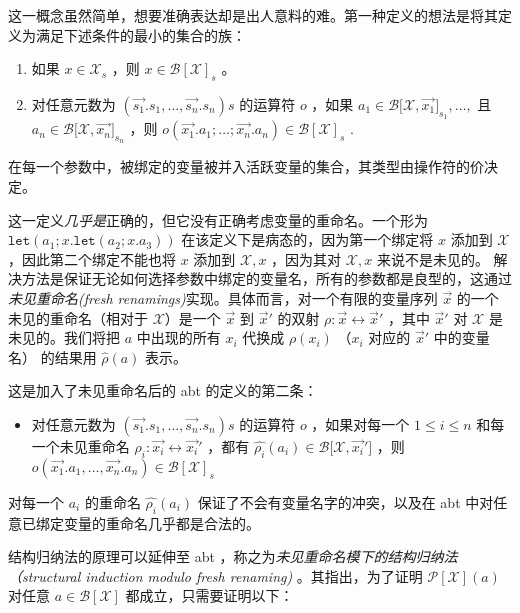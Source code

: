 这一概念虽然简单，想要准确表达却是出人意料的难。第一种定义的想法是将其定义为满足下述条件的最小的集合的族：

\begin{enumerate}
\def\labelenumi{\arabic{enumi}.}
\item
  如果 \(x\in \mathcal{X}_s\) ，则 \(x \in \mathcal{B[X]}_s\) 。
\item
  对任意元数为 \((\vec{s_1}.s_1,\dots,\vec{s_n}.s_n)s\) 的运算符 \(o\)
  ，如果 \(a_1\in \mathcal{B[X},\vec{x_1}]_{s_1},\dots,\) 且
  \(a_n\in \mathcal{B[X},\vec{x_n}]_{s_n}\) ，则
  \(o(\vec{x_1}.a_1;\dots;\vec{x_n}.a_n)\in \mathcal{B[X]}_s\) .
\end{enumerate}

在每一个参数中，被绑定的变量被并入活跃变量的集合，其类型由操作符的价决定。

这一定义\emph{几乎是}正确的，但它没有正确考虑变量的重命名。一个形为
\(\texttt{let}(a_1;x.\texttt{let}(a_2;x.a_3))\)
在该定义下是病态的，因为第一个绑定将 \(x\) 添加到 \(\mathcal{X}\)
，因此第二个绑定不能也将 \(x\) 添加到 \(\mathcal{X},x\) ，因为其对
\(\mathcal{X},x\) 来说不是未见的。
解决方法是保证无论如何选择参数中绑定的变量名，所有的参数都是良型的，这通过\emph{未见重命名(fresh
renamings)}实现。具体而言，对一个有限的变量序列 \(\vec{x}\)
的一个未见的重命名（相对于 \(\mathcal{X}\)）是一个 \(\vec{x}\) 到
\(\vec{x}'\) 的双射 \(\rho : \vec{x} \leftrightarrow \vec{x}'\) ，其中
\(\vec{x}'\) 对 \(\mathcal{X}\) 是未见的。我们将把 \(a\) 中出现的所有
\(x_i\) 代换成 \(\rho(x_i)\) （\(x_i\) 对应的 \(\vec{x}'\) 中的变量名）
的结果用 \(\hat{\rho}(a)\) 表示。

这是加入了未见重命名后的 abt 的定义的第二条：

\begin{itemize}
\item
  对任意元数为 \((\vec{s_1}.s_1,\dots,\vec{s_n}.s_n)s\) 的运算符 \(o\)
  ，如果对每一个 \(1 \leq i \leq n\) 和每一个未见重命名
  \(\rho_i:\vec{x_i}\leftrightarrow \vec{x_i}'\) ，都有
  \(\hat{\rho_i}(a_i)\in \mathcal{B[X},\vec{x_i}']\) ，则
  \(o(\vec{x_1}.a_1,\dots,\vec{x_n}.a_n)\in \mathcal{B[X]}_s\)
\end{itemize}

对每一个 \(a_i\) 的重命名 \(\hat{\rho_i}(a_i)\)
保证了不会有变量名字的冲突，以及在 abt
中对任意已绑定变量的重命名几乎都是合法的。

结构归纳法的原理可以延伸至 abt
，称之为\emph{未见重命名模下的结构归纳法（structural induction modulo
fresh renaming)} 。其指出，为了证明 \(\mathcal{P[X]}(a)\) 对任意
\(a\in \mathcal{B[X]}\) 都成立，只需要证明以下：

